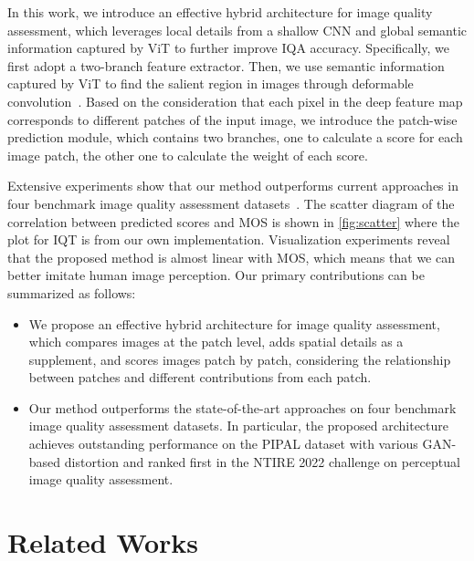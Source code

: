 \documentclass[10pt,twocolumn,letterpaper]{article}
\begin{document}
In this work, we introduce an effective hybrid architecture for image quality assessment, which leverages local details from a shallow CNN and global semantic information captured by ViT to further improve IQA accuracy. Specifically, we first adopt a two-branch feature extractor. Then, we use semantic information captured by ViT to find the salient region in images through deformable convolution~\cite{dai2017deformable}. Based on the consideration that each pixel in the deep feature map corresponds to different patches of the input image, we introduce the patch-wise prediction module, which contains two branches, one to calculate a score for each image patch, the other one to calculate the weight of each score.

Extensive experiments show that our method outperforms current approaches in four benchmark image quality assessment datasets~\cite{sheikh2006statistical,larson2010most,ponomarenko2015image,jinjin2020pipal}. The scatter diagram of the correlation between predicted scores and MOS is shown in \cref{fig:scatter} where the plot for IQT is from our own implementation. Visualization experiments reveal that the proposed method is almost linear with MOS, which means that we can better imitate human image perception. Our primary contributions can be summarized as follows:
\begin{itemize}
\item We propose an effective hybrid architecture for image quality assessment, which compares images at the patch level, adds spatial details as a supplement, and scores images patch by patch, considering the relationship between patches and different contributions from each patch.

\item Our method outperforms the state-of-the-art approaches on four benchmark image quality assessment datasets. In particular, the proposed architecture achieves outstanding performance on the PIPAL dataset with various GAN-based distortion and ranked first in the NTIRE 2022 challenge on perceptual image quality assessment.
\end{itemize}

\section{Related Works}
\label{sec:related}
\end{document}
